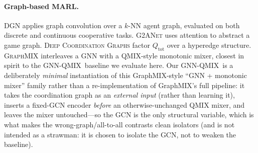 \documentclass[10pt]{article}
\newcommand{\algoname}[1]{\textsc{#1}}
\newcommand{\gnnqmix}{\algoname{GNN-QMIX}}
\newcommand{\Qtot}{Q_{\mathrm{tot}}}
\begin{document}
\paragraph{Graph-based MARL.} \algoname{DGN} \citep{jiang_2020_dgn} applies
graph convolution over a $k$-NN agent graph, evaluated on both discrete
and continuous cooperative tasks.
\algoname{G2ANet} \citep{liu_2020_g2anet} uses attention to abstract a
game graph. \algoname{Deep Coordination Graphs}
\citep{boehmer_2020_dcg} factor $\Qtot$ over a hyperedge structure.
\algoname{GraphMIX} \citep{naderializadeh_2020_graphmix} interleaves a GNN
with a QMIX-style monotonic mixer, closest in spirit to the
\gnnqmix\ baseline we evaluate here. Our \gnnqmix\ is a deliberately
\emph{minimal} instantiation of this GraphMIX-style ``GNN + monotonic mixer''
family rather than a re-implementation of GraphMIX's full pipeline: it
takes the coordination graph as an \emph{external input} (rather than learning
it), inserts a fixed-GCN encoder \emph{before} an otherwise-unchanged QMIX
mixer, and leaves the mixer untouched---so the GCN is the only structural
variable, which is what makes the wrong-graph/all-to-all contrasts clean
isolators (and is not intended as a strawman: it is chosen to isolate the GCN,
not to weaken the baseline).
\end{document}
